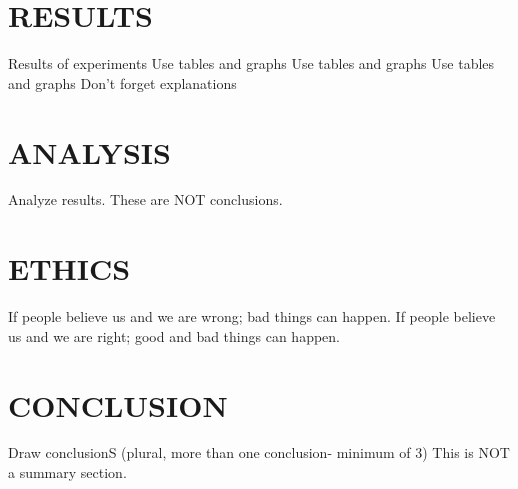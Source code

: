 \documentclass[]{llncs}
\begin{document}
\section{RESULTS}
Results of experiments
Use tables and graphs
Use tables and graphs
Use tables and graphs
Don't forget explanations
\section{ANALYSIS}
Analyze results.
These are NOT conclusions.
\section{ETHICS}
If people believe us and we are wrong; bad things can happen. If people believe us and we are right; good and bad things can happen.
\section{CONCLUSION}
Draw conclusionS (plural, more than one conclusion- minimum of 3)
This is NOT a summary section.


\end{document}
